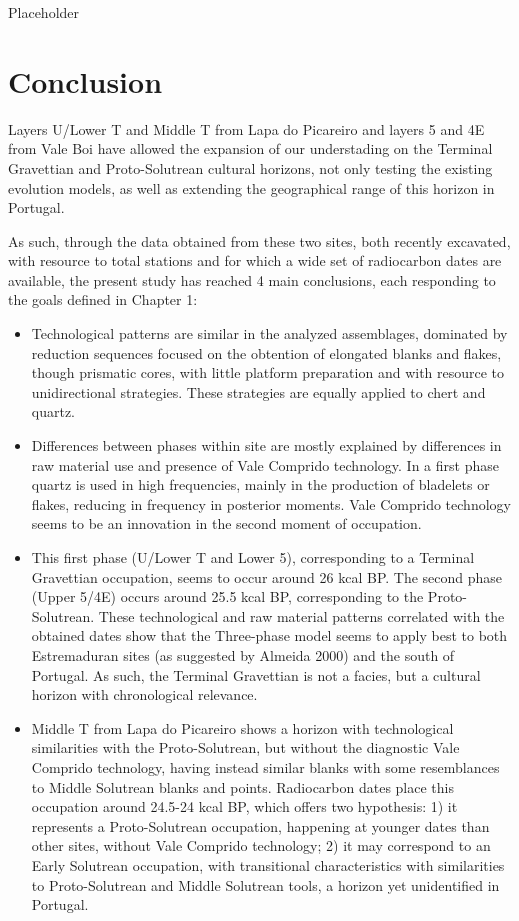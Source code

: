 \documentclass[12pt,twoside]{reedthesis}
\begin{document}
Placeholder

\hypertarget{conclusion}{%
\chapter*{Conclusion}\label{conclusion}}

Layers U/Lower T and Middle T from Lapa do Picareiro and layers 5 and 4E from Vale Boi have allowed the expansion of our understading on the Terminal Gravettian and Proto-Solutrean cultural horizons, not only testing the existing evolution models, as well as extending the geographical range of this horizon in Portugal.

As such, through the data obtained from these two sites, both recently excavated, with resource to total stations and for which a wide set of radiocarbon dates are available, the present study has reached 4 main conclusions, each responding to the goals defined in Chapter 1:
\begin{itemize}
\item
  Technological patterns are similar in the analyzed assemblages, dominated by reduction sequences focused on the obtention of elongated blanks and flakes, though prismatic cores, with little platform preparation and with resource to unidirectional strategies. These strategies are equally applied to chert and quartz.
\item
  Differences between phases within site are mostly explained by differences in raw material use and presence of Vale Comprido technology. In a first phase quartz is used in high frequencies, mainly in the production of bladelets or flakes, reducing in frequency in posterior moments. Vale Comprido technology seems to be an innovation in the second moment of occupation.
\item
  This first phase (U/Lower T and Lower 5), corresponding to a Terminal Gravettian occupation, seems to occur around 26 kcal BP. The second phase (Upper 5/4E) occurs around 25.5 kcal BP, corresponding to the Proto-Solutrean. These technological and raw material patterns correlated with the obtained dates show that the Three-phase model seems to apply best to both Estremaduran sites (as suggested by Almeida 2000) and the south of Portugal. As such, the Terminal Gravettian is not a facies, but a cultural horizon with chronological relevance.
\item
  Middle T from Lapa do Picareiro shows a horizon with technological similarities with the Proto-Solutrean, but without the diagnostic Vale Comprido technology, having instead similar blanks with some resemblances to Middle Solutrean blanks and points. Radiocarbon dates place this occupation around 24.5-24 kcal BP, which offers two hypothesis: 1) it represents a Proto-Solutrean occupation, happening at younger dates than other sites, without Vale Comprido technology; 2) it may correspond to an Early Solutrean occupation, with transitional characteristics with similarities to Proto-Solutrean and Middle Solutrean tools, a horizon yet unidentified in Portugal.
\end{itemize}
\end{document}
